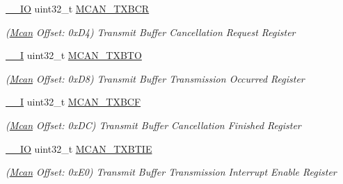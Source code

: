 \begin{DoxyCompactItemize}
\mbox{\label{structMcan_a06465098978dc990022a332519806a08}} 
\mbox{\hyperlink{core__cm7_8h_aec43007d9998a0a0e01faede4133d6be}{\+\_\+\+\_\+\+IO}} uint32\+\_\+t \mbox{\hyperlink{structMcan_a06465098978dc990022a332519806a08}{M\+C\+A\+N\+\_\+\+T\+X\+B\+CR}}
\begin{DoxyCompactList}\small\item\em (\mbox{\hyperlink{structMcan}{Mcan}} Offset\+: 0x\+D4) Transmit Buffer Cancellation Request Register \end{DoxyCompactList}\item 
\mbox{\label{structMcan_a0f8faa40665fd7fbd2914193cecc88e5}} 
\mbox{\hyperlink{core__cm7_8h_af63697ed9952cc71e1225efe205f6cd3}{\+\_\+\+\_\+I}} uint32\+\_\+t \mbox{\hyperlink{structMcan_a0f8faa40665fd7fbd2914193cecc88e5}{M\+C\+A\+N\+\_\+\+T\+X\+B\+TO}}
\begin{DoxyCompactList}\small\item\em (\mbox{\hyperlink{structMcan}{Mcan}} Offset\+: 0x\+D8) Transmit Buffer Transmission Occurred Register \end{DoxyCompactList}\item 
\mbox{\label{structMcan_aa43b39e2dca752502a6f7bc9eae9190f}} 
\mbox{\hyperlink{core__cm7_8h_af63697ed9952cc71e1225efe205f6cd3}{\+\_\+\+\_\+I}} uint32\+\_\+t \mbox{\hyperlink{structMcan_aa43b39e2dca752502a6f7bc9eae9190f}{M\+C\+A\+N\+\_\+\+T\+X\+B\+CF}}
\begin{DoxyCompactList}\small\item\em (\mbox{\hyperlink{structMcan}{Mcan}} Offset\+: 0x\+DC) Transmit Buffer Cancellation Finished Register \end{DoxyCompactList}\item 
\mbox{\label{structMcan_a0a3641163398b74a22516a3bd19bb085}} 
\mbox{\hyperlink{core__cm7_8h_aec43007d9998a0a0e01faede4133d6be}{\+\_\+\+\_\+\+IO}} uint32\+\_\+t \mbox{\hyperlink{structMcan_a0a3641163398b74a22516a3bd19bb085}{M\+C\+A\+N\+\_\+\+T\+X\+B\+T\+IE}}
\begin{DoxyCompactList}\small\item\em (\mbox{\hyperlink{structMcan}{Mcan}} Offset\+: 0x\+E0) Transmit Buffer Transmission Interrupt Enable Register \end{DoxyCompactList}\item 
\mbox{\label{structMcan_a6960c238498346b677232d3a18add1a6}} 

\end{DoxyCompactItemize}
